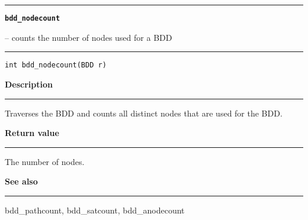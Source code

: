 \begin{minipage}{\textwidth}

\noindent\begin{minipage}{\textwidth}
\rule{\textwidth}{0.5mm}
{\tt\bf bdd\_nodecount }
\--- counts the number of nodes used for a BDD  \hspace{\fill}
\\\rule[1.5ex]{\textwidth}{0.5mm}
\end{minipage}

\noindent\begin{verbatim}
int bdd_nodecount(BDD r) 
\end{verbatim}

\vspace{\parsep}\noindent
{\bf Description}\\\rule[1.5ex]{\textwidth}{0.2mm}\vspace{-1.5ex}\setlength{\parindent}{1em}
Traverses the BDD and counts all distinct nodes that are used
           for the BDD. 

\setlength{\parindent}{0em}\vspace{\parsep}\vspace{\baselineskip}\noindent
{\bf Return value}\\\rule[1.5ex]{\textwidth}{0.2mm}\vspace{-1.5ex}
The number of nodes. 

\vspace{\parsep}\vspace{\baselineskip}\noindent
{\bf See also}\\\rule[1.5ex]{\textwidth}{0.2mm}\vspace{-1.5ex}
bdd\_pathcount, bdd\_satcount, bdd\_anodecount 
\end{minipage}
\vspace{8ex}
